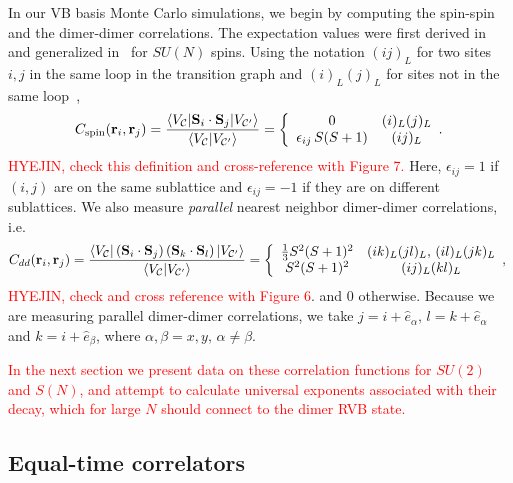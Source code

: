 \documentclass[11pt]{iopart}
\begin{document}
In our VB basis Monte Carlo simulations, we begin by computing the spin-spin and the dimer-dimer correlations. The expectation values were first derived in~\cite{beach2006some} and generalized in~\cite{beach2009n} for $SU(N)$ spins.  Using the notation $(ij)_L$ for two sites $i,j$ in the same loop in the transition graph and $(i)_L(j)_L$ for sites not in the same loop~\cite{RVB2},
\begin{equation}
C_{\rm spin}({\bf r}_i, {\bf r}_j) = \frac{\langle V_\mathcal{C} | \mathbf{S}_i \cdot \mathbf{S}_j | V_{\mathcal{C}'} \rangle}{\langle V_\mathcal{C} | V_{\mathcal{C}'} \rangle} = \left\{ \begin{array}{ccc}
0 & (i)_L (j)_L\\
\epsilon_{ij} \, S (S+1) & (ij)_L   \end{array}. \right.
\end{equation}
\textcolor{red}{HYEJIN, check this definition and cross-reference with Figure 7.}
Here, $\epsilon_{ij} = 1$ if $(i,j)$ are on the same sublattice and $\epsilon_{ij} = -1$ if they are on different sublattices.
We also measure \textit{parallel} nearest neighbor dimer-dimer correlations, i.e.
\begin{equation}
C_{dd}({\bf r}_i, {\bf r}_j)  = \frac{\langle V_\mathcal{C} | \left( \mathbf{S}_i \cdot \mathbf{S}_j \right) \left( \mathbf{S}_k \cdot \mathbf{S}_l  \right) | V_{\mathcal{C}'} \rangle}{\langle V_\mathcal{C} | V_{\mathcal{C}'} \rangle} = \left\{ \begin{array}{ccc}
\frac{1}{3} S^2 (S+1)^2 & (ik)_L (jl)_L, \,(il)_L (jk)_L\\
S^2 (S+1)^2 & (ij)_L (kl)_L \end{array}, \right.
\end{equation}
\textcolor{red}{HYEJIN, check and cross reference with Figure 6}.
and $0$ otherwise. Because we are measuring parallel dimer-dimer correlations, we take $j = i + \hat{e}_\alpha, \, l = k + \hat{e}_\alpha$ and $k = i + \hat{e}_\beta$, where $\alpha,\beta = x, y, \, \alpha \neq \beta$.

\textcolor{red}{
In the next section we present data on these correlation functions for $SU(2)$ and $S(N)$, and attempt to calculate  universal exponents associated with their decay, which for large $N$ should connect to the dimer RVB state.
}

\subsection{Equal-time correlators}
\label{sec:dimerdimer}
\end{document}
